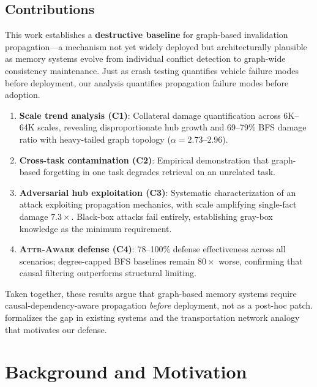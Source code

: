 \documentclass[11pt]{article}
\newcommand{\attraware}{\textsc{Attr-Aware}}
\begin{document}
\subsection{Contributions}

This work establishes a \textbf{destructive baseline} for graph-based invalidation propagation---a mechanism not yet widely deployed but architecturally plausible as memory systems evolve from individual conflict detection to graph-wide consistency maintenance.
Just as crash testing quantifies vehicle failure modes before deployment, our analysis quantifies propagation failure modes before adoption.

\begin{enumerate}
  \item \textbf{Scale trend analysis (C1)}: Collateral damage quantification across 6K--64K scales, revealing disproportionate hub growth and 69--79\% BFS damage ratio with heavy-tailed graph topology ($\alpha = 2.73$--$2.96$).

  \item \textbf{Cross-task contamination (C2)}: Empirical demonstration that graph-based forgetting in one task degrades retrieval on an unrelated task.

  \item \textbf{Adversarial hub exploitation (C3)}: Systematic characterization of an attack exploiting propagation mechanics, with scale amplifying single-fact damage $7.3\times$. Black-box attacks fail entirely, establishing gray-box knowledge as the minimum requirement.

  \item \textbf{\attraware{} defense (C4)}: 78--100\% defense effectiveness across all scenarios; degree-capped BFS baselines remain $80\times$ worse, confirming that causal filtering outperforms structural limiting.
\end{enumerate}

\noindent Taken together, these results argue that graph-based memory systems require causal-dependency-aware propagation \textit{before} deployment, not as a post-hoc patch.
 formalizes the gap in existing systems and the transportation network analogy that motivates our defense.


\section{Background and Motivation}
\label{sec:background}
\end{document}
